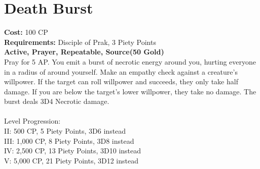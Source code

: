 \section{Death Burst}\label{prayer:deathBurst}
\textbf{Cost:} 100 CP\\
\textbf{Requirements:} Disciple of Prak, 3 Piety Points \\
\textbf{Active, Prayer, Repeatable, Source(50 Gold)}\\
Pray for 5 AP.
You emit a burst of necrotic energy around you, hurting everyone in a radius of  around yourself.
Make an empathy check against a creature's willpower.
If the target can roll willpower and succeeds, they only take half damage.
If you are below the target's lower willpower, they take no damage.
The burst deals 3D4 Necrotic damage.\\
\\
Level Progression:\\
II: 500 CP, 5 Piety Points, 3D6 instead\\
III: 1,000 CP, 8 Piety Points, 3D8 instead\\
IV: 2,500 CP, 13 Piety Points, 3D10 instead\\
V: 5,000 CP, 21 Piety Points, 3D12 instead\\